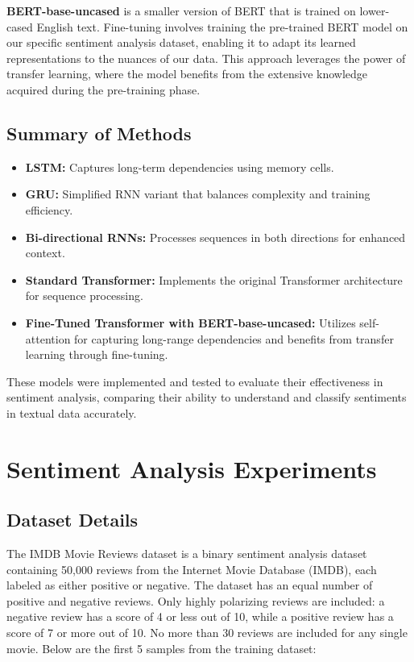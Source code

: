 \documentclass{article}
\begin{document}
\textbf{BERT-base-uncased} is a smaller version of BERT that is trained on lower-cased English text. Fine-tuning involves training the pre-trained BERT model on our specific sentiment analysis dataset, enabling it to adapt its learned representations to the nuances of our data. This approach leverages the power of transfer learning, where the model benefits from the extensive knowledge acquired during the pre-training phase.
\subsection{Summary of Methods}
\begin{itemize}
    \item \textbf{LSTM:} Captures long-term dependencies using memory cells.
    \item \textbf{GRU:} Simplified RNN variant that balances complexity and training efficiency.
    \item \textbf{Bi-directional RNNs:} Processes sequences in both directions for enhanced context.
    \item \textbf{Standard Transformer:} Implements the original Transformer architecture for sequence processing.
    \item \textbf{Fine-Tuned Transformer with BERT-base-uncased:} Utilizes self-attention for capturing long-range dependencies and benefits from transfer learning through fine-tuning.
\end{itemize}

These models were implemented and tested to evaluate their effectiveness in sentiment analysis, comparing their ability to understand and classify sentiments in textual data accurately.

\section{Sentiment Analysis Experiments}

\subsection{Dataset Details}
The IMDB Movie Reviews dataset is a binary sentiment analysis dataset containing 50,000 reviews from the Internet Movie Database (IMDB), each labeled as either positive or negative. The dataset has an equal number of positive and negative reviews. Only highly polarizing reviews are included: a negative review has a score of 4 or less out of 10, while a positive review has a score of 7 or more out of 10. No more than 30 reviews are included for any single movie.
Below are the first 5 samples from the training dataset:
\end{document}
